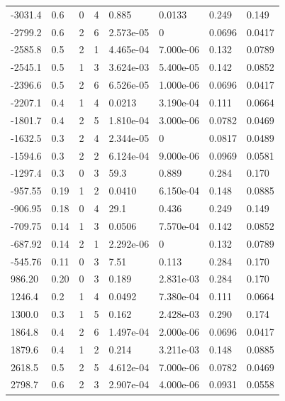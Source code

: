 \documentclass[preview]{standalone}
\begin{document}
{{\begin{tabular}{L{1.2cm}C{1.2cm} C{0.3cm}C{0.5cm} C{1.4cm}C{1.4cm} C{1.4cm}C{1.4cm}}
  -3031.4  &   0.6  & 0     &  4 &  0.885  & 0.0133  & 0.249 &  0.149   \\ 
  -2799.2  &   0.6  & 2     &  6 &  2.573e-05  & 0  & 0.0696 &  0.0417   \\ 
  -2585.8  &   0.5  & 2     &  1 &  4.465e-04  & 7.000e-06  & 0.132 &  0.0789   \\ 
  -2545.1  &   0.5  & 1     &  3 &  3.624e-03  & 5.400e-05  & 0.142 &  0.0852   \\ 
  -2396.6  &   0.5  & 2     &  6 &  6.526e-05  & 1.000e-06  & 0.0696 &  0.0417   \\ 
  -2207.1  &   0.4  & 1     &  4 &  0.0213  & 3.190e-04  & 0.111 &  0.0664   \\ 
  -1801.7  &   0.4  & 2     &  5 &  1.810e-04  & 3.000e-06  & 0.0782 &  0.0469   \\ 
  -1632.5  &   0.3  & 2     &  4 &  2.344e-05  & 0  & 0.0817 &  0.0489   \\ 
  -1594.6  &   0.3  & 2     &  2 &  6.124e-04  & 9.000e-06  & 0.0969 &  0.0581   \\ 
  -1297.4  &   0.3  & 0     &  3 &  59.3  & 0.889  & 0.284 &  0.170   \\ 
  -957.55  &  0.19  & 1     &  2 &  0.0410  & 6.150e-04  & 0.148 &  0.0885   \\ 
  -906.95  &  0.18  & 0     &  4 &  29.1  & 0.436  & 0.249 &  0.149   \\ 
  -709.75  &  0.14  & 1     &  3 &  0.0506  & 7.570e-04  & 0.142 &  0.0852   \\ 
  -687.92  &  0.14  & 2     &  1 &  2.292e-06  & 0  & 0.132 &  0.0789   \\ 
  -545.76  &  0.11  & 0     &  3 &  7.51  & 0.113  & 0.284 &  0.170   \\ 
  986.20  &  0.20  & 0     &  3 &  0.189  & 2.831e-03  & 0.284 &  0.170   \\ 
  1246.4  &   0.2  & 1     &  4 &  0.0492  & 7.380e-04  & 0.111 &  0.0664   \\ 
  1300.0  &   0.3  & 1     &  5 &  0.162  & 2.428e-03  & 0.290 &  0.174   \\ 
  1864.8  &   0.4  & 2     &  6 &  1.497e-04  & 2.000e-06  & 0.0696 &  0.0417   \\ 
  1879.6  &   0.4  & 1     &  2 &  0.214  & 3.211e-03  & 0.148 &  0.0885   \\ 
  2618.5  &   0.5  & 2     &  5 &  4.612e-04  & 7.000e-06  & 0.0782 &  0.0469   \\ 
  2798.7  &   0.6  & 2     &  3 &  2.907e-04  & 4.000e-06  & 0.0931 &  0.0558   \\ 

\end{tabular}}}
\end{document}
